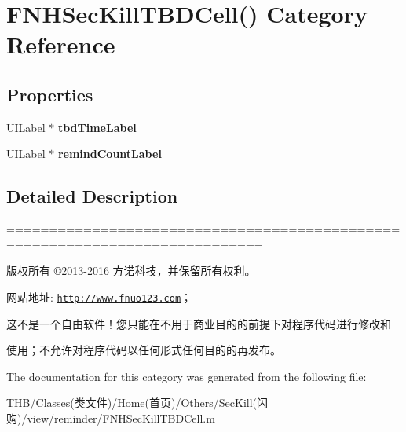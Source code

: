 \hypertarget{category_f_n_h_sec_kill_t_b_d_cell_07_08}{}\section{F\+N\+H\+Sec\+Kill\+T\+B\+D\+Cell() Category Reference}
\label{category_f_n_h_sec_kill_t_b_d_cell_07_08}
\subsection*{Properties}
\begin{DoxyCompactItemize}
\item 
\mbox{\label{category_f_n_h_sec_kill_t_b_d_cell_07_08_a6ca22c52f7773cfa03f2a985ece14d10}} 
U\+I\+Label $\ast$ {\bfseries tbd\+Time\+Label}
\item 
\mbox{\label{category_f_n_h_sec_kill_t_b_d_cell_07_08_adcdf80245c29c9a8ca7461f9fe5f9fdb}} 
U\+I\+Label $\ast$ {\bfseries remind\+Count\+Label}
\end{DoxyCompactItemize}


\subsection{Detailed Description}
============================================================================

版权所有 ©2013-\/2016 方诺科技，并保留所有权利。

网站地址\+: \href{http://www.fnuo123.com}{\tt http\+://www.\+fnuo123.\+com}； 



这不是一个自由软件！您只能在不用于商业目的的前提下对程序代码进行修改和

使用；不允许对程序代码以任何形式任何目的的再发布。 

 

The documentation for this category was generated from the following file\+:\begin{DoxyCompactItemize}
\item 
T\+H\+B/\+Classes(类文件)/\+Home(首页)/\+Others/\+Sec\+Kill(闪购)/view/reminder/F\+N\+H\+Sec\+Kill\+T\+B\+D\+Cell.\+m\end{DoxyCompactItemize}
